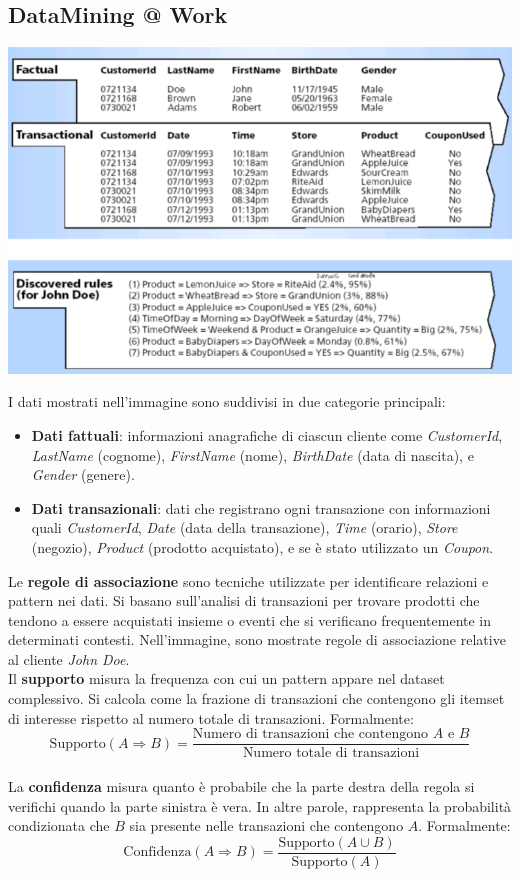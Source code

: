 \documentclass{report}
\begin{document}
	\subsection{DataMining @ Work}
	\begin{center}
		\includegraphics[scale=0.6]{assets/dataminingwork.png}
	\end{center}
	I dati mostrati nell'immagine sono suddivisi in due categorie principali:
	\begin{itemize}
    	\item \textbf{Dati fattuali}: informazioni anagrafiche di ciascun cliente come \textit{CustomerId}, \textit{LastName} (cognome), \textit{FirstName} (nome), \textit{BirthDate} (data di nascita), e \textit{Gender} (genere).
    	\item \textbf{Dati transazionali}: dati che registrano ogni transazione con informazioni quali \textit{CustomerId}, \textit{Date} (data della transazione), \textit{Time} (orario), \textit{Store} (negozio), \textit{Product} (prodotto acquistato), e se è stato utilizzato un \textit{Coupon}.
	\end{itemize}

	Le \textbf{regole di associazione} sono tecniche utilizzate per identificare relazioni e pattern nei dati. Si basano sull'analisi di transazioni per trovare prodotti che tendono a essere acquistati insieme o eventi che si verificano frequentemente in determinati contesti. Nell'immagine, sono mostrate regole di associazione relative al cliente \textit{John Doe}.
	\vspace{\baselineskip}\\
	Il \textbf{supporto} misura la frequenza con cui un pattern appare nel dataset complessivo. Si calcola come la frazione di transazioni che contengono gli itemset di interesse rispetto al numero totale di transazioni. Formalmente:
	\[
		\text{Supporto}(A \Rightarrow B) = \frac{\text{Numero di transazioni che contengono } A \text{ e } B}{\text{Numero totale di transazioni}}
	\]
    \vspace{\baselineskip}\\
	La \textbf{confidenza} misura quanto è probabile che la parte destra della regola si verifichi quando la parte sinistra è vera. In altre parole, rappresenta la probabilità condizionata che $B$ sia presente nelle transazioni che contengono $A$. Formalmente:
	\[
		\text{Confidenza}(A \Rightarrow B) = \frac{\text{Supporto}(A \cup B)}{\text{Supporto}(A)}
	\]
\end{document}
